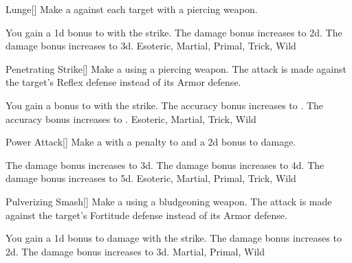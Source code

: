 \lowercase{\hypertarget{maneuver:Lunge}{}}\label{maneuver:Lunge}
\hypertarget{maneuver:Lunge}{}
\begin{freeability}[Rank 1]{Lunge}[]
Make a  against each target with a piercing weapon.

\rankline
{} You gain a \plus1d bonus to  with the strike.
 The damage bonus increases to \plus2d.
 The damage bonus increases to \plus3d.
 Esoteric, Martial, Primal, Trick, Wild
\end{freeability}
\vspace{0.25em}



\lowercase{\hypertarget{maneuver:Penetrating Strike}{}}\label{maneuver:Penetrating Strike}
\hypertarget{maneuver:Penetrating Strike}{}
\begin{freeability}[Rank 1]{Penetrating Strike}[]
Make a  using a piercing weapon.
The attack is made against the target's Reflex defense instead of its Armor defense.

\rankline
{} You gain a  bonus to  with the strike.
 The accuracy bonus increases to .
 The accuracy bonus increases to .
 Esoteric, Martial, Trick, Wild
\end{freeability}
\vspace{0.25em}



\lowercase{\hypertarget{maneuver:Power Attack}{}}\label{maneuver:Power Attack}
\hypertarget{maneuver:Power Attack}{}
\begin{freeability}[Rank 1]{Power Attack}[]
Make a  with a  penalty to  and a \plus2d bonus to damage.

\rankline
{} The damage bonus increases to \plus3d.
 The damage bonus increases to \plus4d.
 The damage bonus increases to \plus5d.
 Esoteric, Martial, Primal, Trick, Wild
\end{freeability}
\vspace{0.25em}



\lowercase{\hypertarget{maneuver:Pulverizing Smash}{}}\label{maneuver:Pulverizing Smash}
\hypertarget{maneuver:Pulverizing Smash}{}
\begin{freeability}[Rank 1]{Pulverizing Smash}[]
Make a  using a bludgeoning weapon.
The attack is made against the target's Fortitude defense instead of its Armor defense.

\rankline
{} You gain a \plus1d bonus to damage with the strike.
 The damage bonus increases to \plus2d.
 The damage bonus increases to \plus3d.
 Martial, Primal, Wild
\end{freeability}
\vspace{0.25em}



